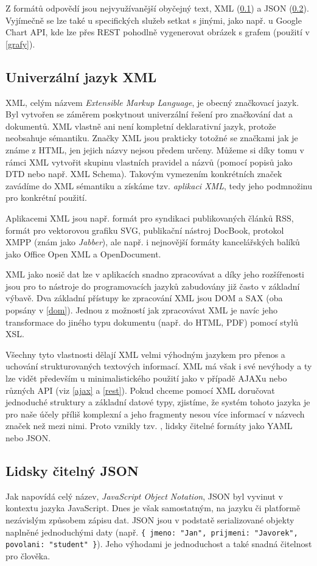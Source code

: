 Z formátů odpovědí jsou nej\-využívanější obyčejný text, XML (\ref{xml})
a JSON (\ref{json}). Vyjímečně se lze také u specifických služeb
setkat s jinými, jako např. u Google Chart API, kde lze přes REST
pohodlně vygenerovat obrázek s grafem (použití v \ref{grafy}).

\subsection{Univerzální jazyk XML}\label{xml}
XML, celým názvem {\it Extensible Markup Language}, je obecný
značkovací jazyk. Byl vytvořen se záměrem poskytnout univerzální
řešení pro značkování dat a dokumentů. XML vlastně ani není kompletní
deklarativní jazyk, protože neobsahuje sémantiku. Značky XML jsou
prakticky totožné se značkami jak je známe z HTML, jen jejich názvy
nejsou předem určeny. Můžeme si díky tomu v rámci XML vytvořit skupinu
vlastních pravidel a názvů (pomocí popisů jako DTD nebo např. XML
Schema). Takovým vymezením konkrétních značek zavádíme do XML sémantiku a
získáme tzv. {\it aplikaci XML}, tedy jeho podmnožinu pro konkrétní
použití.

Aplikacemi XML jsou např. formát pro syndikaci publikovaných článků
RSS, formát pro vektorovou grafiku SVG, publikační nástroj DocBook,
protokol XMPP (znám jako {\it Jabber}), ale např. i nejnovější
formáty kancelářských balíků jako Office Open XML a OpenDocument.

XML jako nosič dat lze v aplikacích snadno zpracovávat a díky jeho
rozšířenosti jsou pro to nástroje do programovacích jazyků zabudovány
již často v základní výbavě. Dva základní přístupy ke
zpracování XML jsou DOM a SAX (oba popsány v \ref{dom}). Jednou z
možností jak zpracovávat XML je navíc jeho transformace do jiného typu
dokumentu (např. do HTML, PDF) pomocí stylů XSL.

Všechny tyto vlastnosti dělají XML velmi výhodným jazykem pro přenos
a uchování strukturovaných textových informací. XML má však i své
nevýhody a ty lze vidět především u minimalistického použití jako v
případě AJAXu nebo různých API (viz \ref{ajax} a \ref{rest}). Pokud
chceme pomocí XML doručovat jednoduché struktury a základní datové typy, zjistíme, že systém
tohoto jazyka je pro naše účely příliš komplexní a jeho fragmenty
nesou více informací v názvech značek než mezi nimi. Proto vznikly
tzv. , lidsky čitelné formáty jako YAML nebo JSON.

\subsection{Lidsky čitelný JSON}\label{json}
Jak napovídá celý název, {\it JavaScript Object Notation}, JSON byl
vyvinut v kontextu jazyka JavaScript. Dnes je však samostatným, na
jazyku či platformě nezávislým způsobem zápisu dat. JSON jsou v
podstatě serializované objekty naplněné jednoduchými daty (např.
{\tt \{ jmeno: "Jan", prijmeni: "Javorek", povolani: "student" \}}).
Jeho výhodami je jednoduchost a také snadná čitelnost pro člověka.

